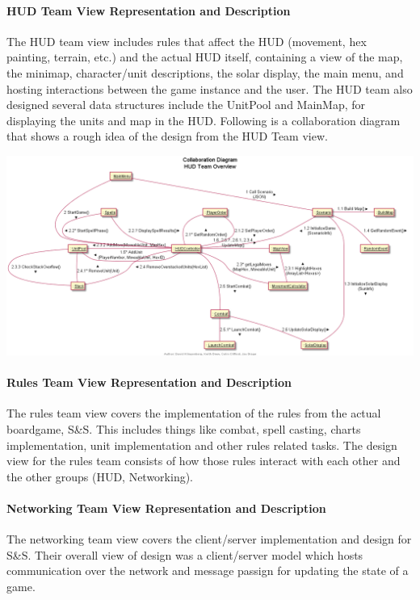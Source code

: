\documentclass[12pt,a4paper,titlepage]{article}
\begin{document}
\paragraph{HUD Team View Representation and Description}
The HUD team view includes rules that affect the HUD (movement, hex painting, terrain, etc.) and the actual HUD itself, containing a view of the map, the minimap, character/unit descriptions, the solar display, the main menu, and hosting interactions between the game instance and the user. The HUD team also designed several data structures include the UnitPool and MainMap, for displaying the units and map in the HUD. Following is a collaboration diagram that shows a rough idea of the design from the HUD Team view.
\begin{center}
\includegraphics[width=\linewidth]{HUDTeamCollab.png}
\end{center}
\paragraph{Rules Team View Representation and Description}
The rules team view covers the implementation of the rules from the actual boardgame, S\&S. This includes things like combat, spell casting, charts implementation, unit implementation and other rules related tasks. The design view for the rules team consists of how those rules interact with each other and the other groups (HUD, Networking).
\paragraph{Networking Team View Representation and Description}
The networking team view covers the client/server implementation and design for S\&S. Their overall view of design was a client/server model which hosts communication over the network and message passign for updating the state of a game. 
\end{document}

